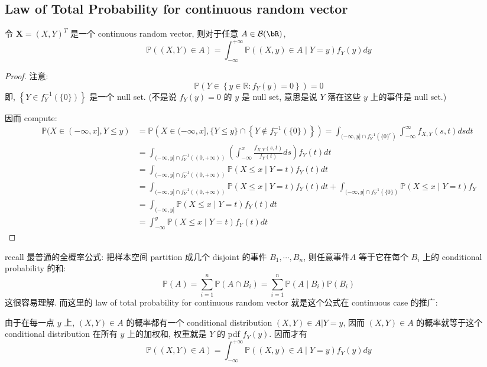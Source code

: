 \subsection{Law of Total Probability for continuous random vector}
\begin{theorem}\label{law of total probability for continuous random vector}
    令 \(\mathbf{X} = (X, Y)^T\) 是一个 continuous random vector, 
    则对于任意 \(A \in \mathcal{B}(\bR) \), 
    \[
    \mathbb{P}((X, Y) \in A)=\int_{-\infty}^{+\infty} \mathbb{P}((X, y) \in A \mid Y=y) f_Y(y) d y
    \]
\end{theorem}
\begin{proof}
    注意: \[
    \mathbb{P}\left(Y \in\left\{y \in \mathbb{R}: f_Y(y)=0\right\}\right)=0
    \]
    即, \(\left\{Y \in f_Y^{-1}(\{0\})\right\} \) 是一个 null set. (不是说 \(f_Y(y) = 0\) 的 \(y\) 是 null set, 
    意思是说 \(Y\) 落在这些 \(y\) 上的事件是 null set.)

    因而 compute: 
    \begin{align*}
\mathbb{P}(X \in(-\infty, x], Y \leq y) & =\mathbb{P}\left(X \in(-\infty, x],\{Y \leq y\} \cap\left\{Y \notin f_Y^{-1}(\{0\})\right\}\right)=\int_{(-\infty, y] \cap f_Y^{-1}\left(\{0\}^c\right)} \int_{-\infty}^{\infty} f_{X, Y}(s, t) d s d t \\
& =\int_{(-\infty, y] \cap f_Y^{-1}((0,+\infty))}\left(\int_{-\infty}^x \frac{f_{X, Y}(s, t)}{f_Y(t)} d s\right) f_Y(t) d t \\
& =\int_{(-\infty, y] \cap f_Y^{-1}((0,+\infty))} \mathbb{P}(X \leq x \mid Y=t) f_Y(t) d t \\
& =\int_{(-\infty, y] \cap f_Y^{-1}((0,+\infty))} \mathbb{P}(X \leq x \mid Y=t) f_Y(t) d t+\int_{(-\infty, y] \cap f_Y^{-1}(\{0\})} \mathbb{P}(X \leq x \mid Y=t) f_Y \\
& =\int_{(-\infty, y]} \mathbb{P}(X \leq x \mid Y=t) f_Y(t) d t \\
& =\int_{-\infty}^y \mathbb{P}(X \leq x \mid Y=t) f_Y(t) d t
\end{align*}
\end{proof}
\begin{remark}
    recall 最普通的全概率公式: 把样本空间 partition 成几个 disjoint 的事件 \(B_1, \cdots, B_n\),
    则任意事件\(A\) 等于它在每个 \(B_i\) 上的 conditional probability 的和:
    $$\mathbb{P}(A) = \sum_{i=1}^n \mathbb{P}(A \cap B_i) = \sum_{i=1}^n \mathbb{P}(A \mid B_i) \mathbb{P}(B_i)$$
    这很容易理解. 而这里的 law of total probability for continuous random vector 就是这个公式在 continuous case 的推广:

    由于在每一点 \(y\) 上, \((X,Y) \in A\) 的概率都有一个 conditional distribution \((X,Y)\in A | Y = y\), 因而
    \((X,Y) \in A\) 的概率就等于这个 conditional distribution 在所有 \(y\) 上的加权和, 权重就是 \(Y\) 的 pdf \(f_Y(y)\). 
    因而才有 \[
    \mathbb{P}((X, Y) \in A)=\int_{-\infty}^{+\infty} \mathbb{P}((X, y) \in A \mid Y=y) f_Y(y) d y
    \]
\end{remark}


